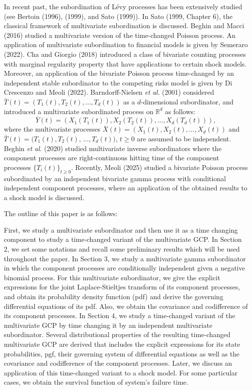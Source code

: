 \documentclass[12pt,oneside,reqno]{amsart}
\numberwithin{equation}{section}
\theoremstyle{definition}
\numberwithin{equation}{section}
\theoremstyle{remarkstyle}
\begin{document}
In recent past, the subordination of L\'evy processes has been extensively studied (see Bertoin (1996), (1999), and Sato (1999)). In Sato (1999, Chapter 6), the classical framework of multivariate subordination is discussed. Beghin and Macci (2016) studied a multivariate version of the time-changed Poisson process. An application of multivariate subordination to financial models is given by Semeraro (2022). Cha and Giorgio (2018) introduced a class of bivariate counting processes with marginal regularity property that have applications to certain shock models. Moreover, an application of the bivariate  Poisson process time-changed by an independent stable subordinator to the competing risks model is given by Di Crescenzo and Meoli (2022). Barndorff-Nielsen {\it et al.} (2001) considered $\bar{T}(t)=(T_1(t), T_2(t),\dots,T_d(t))$ as a $d$-dimensional subordinator, and introduced a multivariate subordinated process on $\mathbb{R}^d$ as follows: 
\begin{equation*}
 \bar{Y}(t)=(X_1(T_1(t)),X_2(T_2(t)),\dots,X_d(T_d(t))),
\end{equation*}
where the multivariate processes $\bar{X}(t)=(X_1(t),X_2(t),\dots,X_d(t))$ and $\bar{T}(t)=(T_1(t),T_2(t)$, $\dots,T_d(t))$, $t\ge0$ are assumed to be independent. Beghin \textit{et al.} (2020) studied multivariate inverse subordinators where the component processes are right-continuous hitting time of the component processes $\{T_i(t)\}_{t\ge0}$. Recently, Meoli (2025) studied a bivariate Poisson process subordinated by an independent bivariate gamma process with conditional independent component processes, where an application of the obtained results to a shock model is discussed. 

The outline of this paper is as follows:

First, we study a multivariate subordinator and then use it as a time changing component to study a time-changed variant of the multivariate GCP. In Section 2, we set some notations and recall some preliminary results which will be used throughout the paper. In Section 3, we study a multivariate gamma subordinator in which the component processes are conditionally independent given a negative binomial process. For this multivariate subordinator, we give the explicit expressions for the joint Laplace-Stieltjes transform of its component processes, and obtain its probability density function (pdf) and derive the governing differential equations of its pdf. Also, we obtain the covariance and codifference of its component processes. In Section 4, we study a time-changed variant of the multivariate GCP by time changing it by an independent multivariate subordinator. Several distributional properties of the resulting time-changed multivariate GCP are derived that includes the explicit expressions for its state probabilities, pgf, their governing system of differential equations as well as the covariance and codifference of the component processes. Later, we discuss an application of this time-changed variant to a shock model. For some particular cases, we obtain the survival function of system's failure time.
\end{document}
